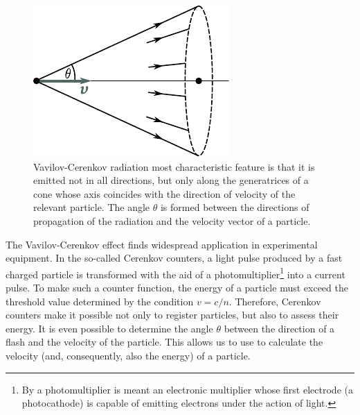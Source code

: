 \begin{figure}[t]
	\begin{center}
		\includegraphics[scale=1]{figures/ch_20/fig_20_11.pdf}
        \caption[]{Vavilov-Cerenkov radiation most characteristic feature is that it is emitted not in all directions, but only along the generatrices of a cone whose axis coincides with the direction of velocity of the relevant particle. The angle $\theta$ is formed between the directions of propagation of the radiation and the velocity vector of a particle.}
		\label{fig:20_11}
	\end{center}
	\vspace{-0.8cm}
\end{figure}

The Vavilov-Cerenkov effect finds widespread application in experimental equipment.
In the so-called Cerenkov counters, a light pulse produced by a fast charged particle is transformed with the aid of a photomultiplier\footnote{By a photomultiplier is meant an electronic multiplier whose first electrode (a photocathode) is capable of emitting electrons under the action of light.} into a current pulse.
To make such a counter function, the energy of a particle must exceed the threshold value determined by the condition $v = c/n$.
Therefore, Cerenkov counters make it possible not only to register particles, but also to assess their energy.
It is even possible to determine the angle $\theta$ between the direction of a flash and the velocity of the particle.
This allows us to use  to calculate the velocity (and, consequently, also the energy) of a particle.
